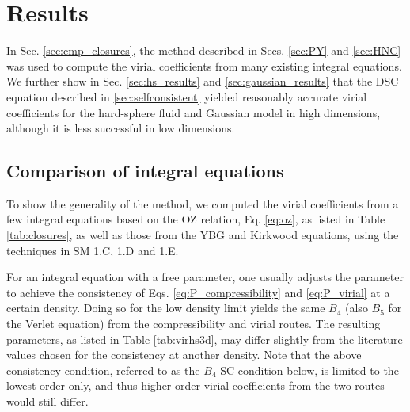 \documentclass[aip,jcp,preprint,superscriptaddress,showpacs,preprintnumbers,amsmath,amssymb]{revtex4-1}
\begin{document}
\section{\label{sec:results}
Results}




In Sec. \ref{sec:cmp_closures},
the method described in Secs. \ref{sec:PY} and \ref{sec:HNC}
was used to compute the virial coefficients from
many existing integral equations.
%
We further show in Sec. \ref{sec:hs_results}
and \ref{sec:gaussian_results}
that the DSC equation described in \ref{sec:selfconsistent}
yielded reasonably accurate virial coefficients
for the hard-sphere fluid and Gaussian model in high dimensions,
although it is less successful in low dimensions.




\subsection{\label{sec:cmp_closures}
Comparison of integral equations}






To show the generality of the method,
we computed the virial coefficients from
a few integral equations based on the OZ relation, Eq. \eqref{eq:oz},
as listed in Table \ref{tab:closures},
as well as those from the YBG\cite{
yvon1935, *born1946, nijboer1952, hill, *rice1965, hansen}
and Kirkwood\cite{kirkwood1935, hill, *rice1965, hoover1962, stell1962}
equations, using the techniques in SM 1.C, 1.D and 1.E.



For an integral equation with a free parameter,
one usually adjusts the parameter to achieve
the consistency of
Eqs. \eqref{eq:P_compressibility} and \eqref{eq:P_virial}
at a certain density.
%
Doing so for the low density limit
yields the same $B_4$
(also $B_5$ for the Verlet equation\cite{verlet1980})
from the compressibility and virial routes.
%
The resulting parameters, as listed in Table \ref{tab:virhs3d},
may differ slightly from the literature values
chosen for the consistency at another density.
%
Note that the above consistency condition,
referred to as the $B_4$-SC condition below,
is limited to the lowest order only,
and thus higher-order virial coefficients from the two routes
would still differ.
\end{document}
